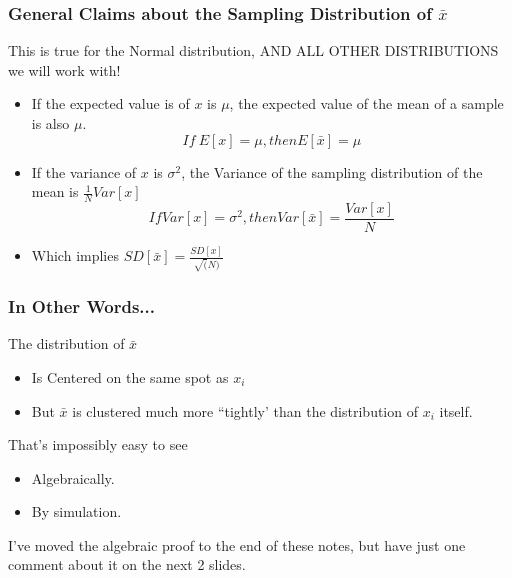 \documentclass[10pt,english]{beamer}
\begin{document}
\begin{frame}
  \frametitle{General Claims about the Sampling Distribution of $\bar{x}$}
  This is true for the Normal distribution, AND ALL OTHER
  DISTRIBUTIONS we will work with!
  \begin{itemize}
  \item If the expected value is of $x$ is $\mu$, the expected value of the mean
    of a sample is also $\mu$.
    \begin{displaymath}
      If \ E[x] = \mu, then E[\bar{x}]=\mu
    \end{displaymath}

  \item If the variance of $x$ is $\sigma^2$, the Variance of the
    sampling distribution of the mean is $\frac{1}{N}Var[x]$
    \begin{displaymath}
      If Var[x] = \sigma^{2}, then Var[\bar{x}]=\frac{Var[x]}{N}
    \end{displaymath}
  \item Which implies $SD[\bar{x}]=\frac{SD[x]}{\sqrt(N)}$
  \end{itemize}
\end{frame}



\begin{frame}
  \frametitle{In Other Words...}

  The distribution of $\bar{x}$
  \begin{itemize}
  \item Is Centered on the same spot as $x_{i}$
  \item But $\bar{x}$ is clustered much  more ``tightly'
    than the distribution of $x_{i}$ itself.
  \end{itemize}

  That's impossibly easy to see

  \begin{itemize}
  \item Algebraically.
  \item By simulation.
  \end{itemize}

  I've moved the algebraic proof to the end of these notes, but
  have just one comment about it on the next 2 slides.
\end{frame}
\end{document}
